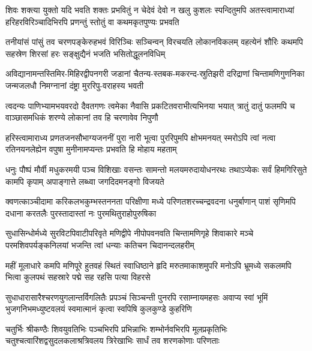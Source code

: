 

\fourlineindentedshloka
{शिवः शक्त्या युक्तो यदि भवति शक्तः प्रभवितुं}
{न चेदेवं देवो न खलु कुशलः स्पन्दितुमपि}
{अतस्त्वामाराध्यां हरिहरविरिञ्चादिभिरपि}
{प्रणन्तुं स्तोतुं वा कथमकृतपुण्यः प्रभवति}%

\fourlineindentedshloka
{तनीयांसं पांसुं तव चरणपङ्केरुहभवं}
{विरिञ्चिः सञ्चिन्वन् विरचयति लोकानविकलम्}
{वहत्येनं शौरिः कथमपि सहस्रेण शिरसां}
{हरः सङ्क्षुद्यैनं भजति भसितोद्धूलनविधिम्}%

\fourlineindentedshloka
{अविद्यानामन्तस्तिमिर-मिहिरद्वीपनगरी}
{जडानां चैतन्य-स्तबक-मकरन्द-स्रुतिझरी}
{दरिद्राणां चिन्तामणिगुणनिका जन्मजलधौ}
{निमग्नानां दंष्ट्रा मुररिपु-वराहस्य भवती}%

\fourlineindentedshloka
{त्वदन्यः पाणिभ्यामभयवरदो दैवतगणः}
{त्वमेका नैवासि प्रकटितवराभीत्यभिनया}
{भयात् त्रातुं दातुं फलमपि च वाञ्छासमधिकं}
{शरण्ये लोकानां तव हि चरणावेव निपुणौ}%

\fourlineindentedshloka
{हरिस्त्वामाराध्य प्रणतजनसौभाग्यजननीं}
{पुरा नारी भूत्वा पुररिपुमपि क्षोभमनयत्}
{स्मरोऽपि त्वां नत्वा रतिनयनलेह्येन वपुषा}
{मुनीनामप्यन्तः प्रभवति हि मोहाय महताम्}%

\fourlineindentedshloka
{धनुः पौष्पं मौर्वी मधुकरमयी पञ्च विशिखाः}
{वसन्तः सामन्तो मलयमरुदायोधनरथः}
{तथाऽप्येकः सर्वं हिमगिरिसुते कामपि कृपाम्}
{अपाङ्गात्ते लब्ध्वा जगदिदमनङ्गो विजयते}%

\fourlineindentedshloka
{क्वणत्काञ्चीदामा करिकलभकुम्भस्तननता}
{परिक्षीणा मध्ये परिणतशरच्चन्द्रवदना}
{धनुर्बाणान् पाशं सृणिमपि दधाना करतलैः}
{पुरस्तादास्तां नः पुरमथितुराहोपुरुषिका}%

\fourlineindentedshloka
{सुधासिन्धोर्मध्ये सुरविटपिवाटीपरिवृते}
{मणिद्वीपे नीपोपवनवति चिन्तामणिगृहे}
{शिवाकारे मञ्चे परमशिवपर्यङ्कनिलयां}
{भजन्ति त्वां धन्याः कतिचन चिदानन्दलहरीम्}%

\fourlineindentedshloka
{महीं मूलाधारे कमपि मणिपूरे हुतवहं}
{स्थितं स्वाधिष्ठाने हृदि मरुतमाकाशमुपरि}
{मनोऽपि भ्रूमध्ये सकलमपि भित्वा कुलपथं}
{सहस्रारे पद्मे सह रहसि पत्या विहरसे}%

\fourlineindentedshloka
{सुधाधारासारैश्चरणयुगलान्तर्विगलितैः}
{प्रपञ्चं सिञ्चन्ती पुनरपि रसाम्नायमहसः}
{अवाप्य स्वां भूमिं भुजगनिभमध्युष्टवलयं}
{स्वमात्मानं कृत्वा स्वपिषि कुलकुण्डे कुहरिणि}%

\fourlineindentedshloka
{चतुर्भिः श्रीकण्ठैः शिवयुवतिभिः पञ्चभिरपि}
{प्रभिन्नाभिः शम्भोर्नवभिरपि मूलप्रकृतिभिः}
{चतुश्चत्वारिंशद्वसुदलकलाश्रत्रिवलय}
{त्रिरेखाभिः सार्धं तव शरणकोणाः परिणताः}%

